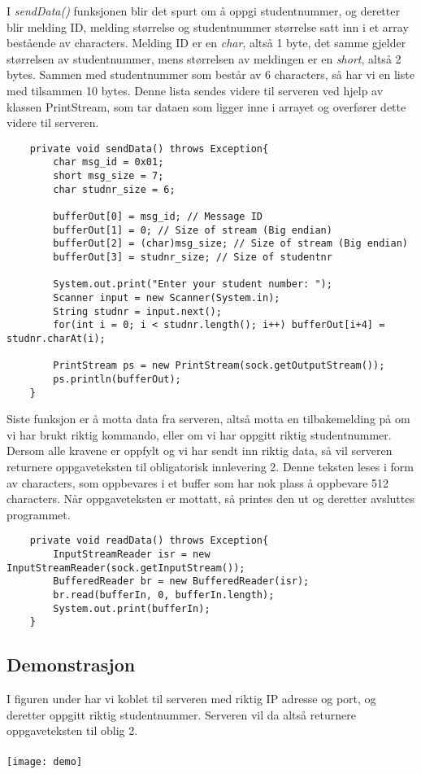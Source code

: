 I \textit{sendData()} funksjonen blir det spurt om å oppgi studentnummer, og deretter blir melding ID, melding størrelse og studentnummer størrelse satt inn i et array bestående av characters. Melding ID er en \textit{char}, altså 1 byte, det samme gjelder størrelsen av studentnummer, mens størrelsen av meldingen er en \textit{short}, altså 2 bytes. Sammen med studentnummer som består av 6 characters, så har vi en liste med tilsammen 10 bytes. Denne lista sendes videre til serveren ved hjelp av klassen PrintStream, som tar dataen som ligger inne i arrayet og overfører dette videre til serveren.
\begin{lstlisting}
	private void sendData() throws Exception{
		char msg_id = 0x01;
		short msg_size = 7;
		char studnr_size = 6;

		bufferOut[0] = msg_id; // Message ID
		bufferOut[1] = 0; // Size of stream (Big endian)
		bufferOut[2] = (char)msg_size; // Size of stream (Big endian)
		bufferOut[3] = studnr_size; // Size of studentnr
		
		System.out.print("Enter your student number: ");
		Scanner input = new Scanner(System.in);
		String studnr = input.next();
		for(int i = 0; i < studnr.length(); i++) bufferOut[i+4] = studnr.charAt(i);
		
		PrintStream ps = new PrintStream(sock.getOutputStream());
		ps.println(bufferOut);
	}
\end{lstlisting}

Siste funksjon er å motta data fra serveren, altså motta en tilbakemelding på om vi har brukt riktig kommando, eller om vi har oppgitt riktig studentnummer. Dersom alle kravene er oppfylt og vi har sendt inn riktig data, så vil serveren returnere oppgaveteksten til obligatorisk innlevering 2. Denne teksten leses i form av characters, som oppbevares i et buffer som har nok plass å oppbevare 512 characters. Når oppgaveteksten er mottatt, så printes den ut og deretter avsluttes programmet.
\begin{lstlisting}
	private void readData() throws Exception{
		InputStreamReader isr = new InputStreamReader(sock.getInputStream());
		BufferedReader br = new BufferedReader(isr);
		br.read(bufferIn, 0, bufferIn.length);
		System.out.print(bufferIn);
	}
\end{lstlisting}

\subsection{Demonstrasjon}
I figuren under har vi koblet til serveren med riktig IP adresse og port, og deretter oppgitt riktig studentnummer. Serveren vil da altså returnere oppgaveteksten til oblig 2.\\\\
\texttt{[image: demo]}
